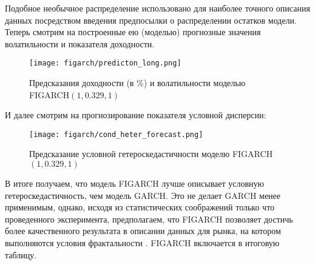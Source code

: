 \noindent Подобное необычное распределение использовано для наиболее точного описания данных посредством введения предпосылки о распределении остатков модели. Теперь смотрим на построенные ею (моделью) прогнозные значения волатильности и показателя доходности.
\begin{figure}[H]
	\centering
	\texttt{[image: figarch/predicton\_long.png]}
	\caption{Предсказания доходности (в \%) и волатильности моделью FIGARCH$(1, 0.329, 1)$}
\end{figure}
\noindent И далее смотрим на прогнозирование показателя условной дисперсии:
\begin{figure}[H]
	\centering
	\texttt{[image: figarch/cond\_heter\_forecast.png]}
	\caption{Предсказание условной гетероскедастичности моделю FIGARCH$(1, 0.329, 1)$}
\end{figure}
\noindent В итоге получаем, что модель FIGARCH лучше описывает условную гетероскедастичность, чем модель GARCH. Это не делает GARCH менее применимым, однако, исходя из статистических соображений только что проведенного эксперимента, предполагаем, что FIGARCH позволяет достичь более качественного результата в описании данных для рынка, на котором выполняются условия фрактальности \cite{fractal_market}. FIGARCH включается в итоговую таблицу.